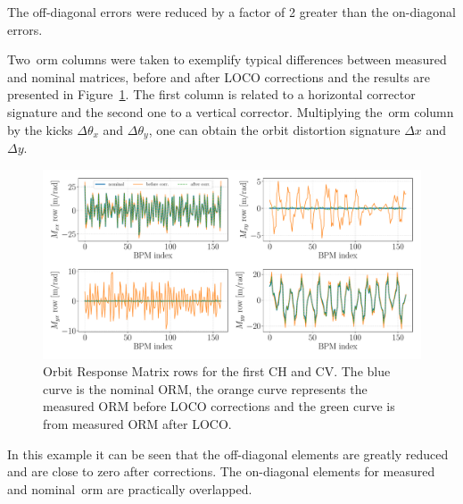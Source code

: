 The off-diagonal errors were reduced by a factor of 2 greater than the on-diagonal errors.

Two~\gls{orm} columns were taken to exemplify typical differences between measured and nominal matrices, before and after LOCO corrections and the results are presented in Figure~\ref{fig:orm_rows}. The first column is related to a horizontal corrector signature and the second one to a vertical corrector. Multiplying the~\gls{orm} column by the kicks $\Delta\theta_x$ and $\Delta\theta_y$, one can obtain the orbit distortion signature $\Delta x$ and $\Delta y$.
\begin{figure}[h!]
\centering
\includegraphics[width=1.0\textwidth]{figures/nominal_measured_after_before_loco_big.pdf}
\caption{Orbit Response Matrix rows for the first CH and CV. The blue curve is the nominal ORM, the orange curve represents the measured ORM before LOCO corrections and the green curve is from measured ORM after LOCO.}
\label{fig:orm_rows}
\end{figure}

In this example it can be seen that the off-diagonal elements are greatly reduced and are close to zero after corrections. The on-diagonal elements for measured and nominal~\gls{orm} are practically overlapped.

